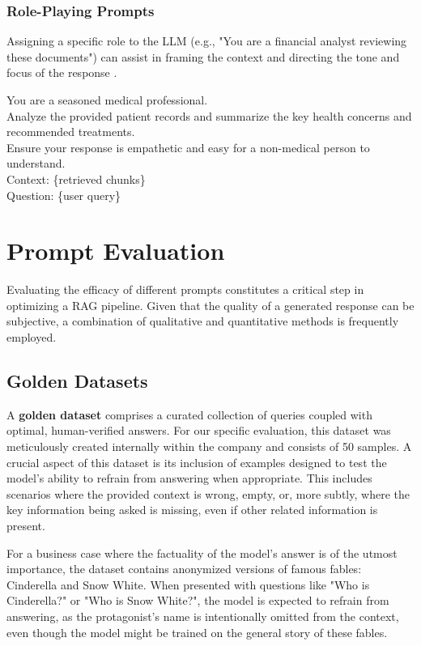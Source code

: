 \subsubsection{Role-Playing Prompts}
Assigning a specific role to the LLM (e.g., "You are a financial analyst reviewing these documents") can assist in framing the context and directing the tone and focus of the response \autocite{tseng-etal-2024-two}.

\begin{tcolorbox}[promptbox,title=Example: Role-Playing Prompt]
You are a seasoned medical professional.\\
Analyze the provided patient records and summarize the key health concerns and recommended treatments.\\
Ensure your response is empathetic and easy for a non-medical person to understand.\\

Context: \{retrieved chunks\}\\

Question: \{user query\}
\end{tcolorbox}

\section{Prompt Evaluation}
Evaluating the efficacy of different prompts constitutes a critical step in optimizing a RAG pipeline. Given that the quality of a generated response can be subjective, a combination of qualitative and quantitative methods is frequently employed.

\subsection{Golden Datasets}
A \textbf{golden dataset} comprises a curated collection of queries coupled with optimal, human-verified answers. For our specific evaluation, this dataset was meticulously created internally within the company and consists of 50 samples. A crucial aspect of this dataset is its inclusion of examples designed to test the model's ability to refrain from answering when appropriate. This includes scenarios where the provided context is wrong, empty, or, more subtly, where the key information being asked is missing, even if other related information is present.

For a business case where the factuality of the model's answer is of the utmost importance, the dataset contains anonymized versions of famous fables: Cinderella and Snow White. When presented with questions like "Who is Cinderella?" or "Who is Snow White?", the model is expected to refrain from answering, as the protagonist's name is intentionally omitted from the context, even though the model might be trained on the general story of these fables.

